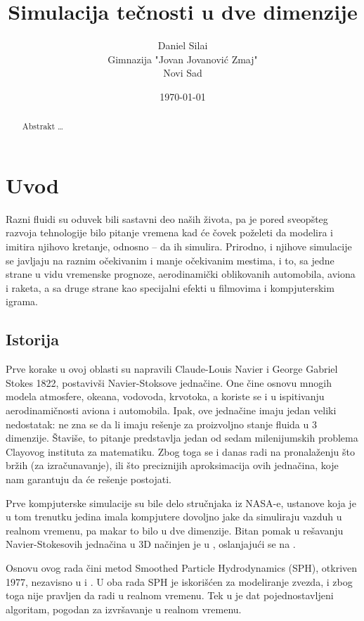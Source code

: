 \documentclass[12pt]{article}
\title{Simulacija te\v cnosti u dve dimenzije}
\author{
        Daniel Sila\dj i \\
        Gimnazija "Jovan Jovanovi\'{c} Zmaj"\\
		Novi Sad
}
\date{\today}
\begin{document}
\maketitle

\begin{abstract}
Abstrakt \ldots
\end{abstract}

\section{Uvod}\label{uvod}
    Razni fluidi su oduvek bili sastavni deo na\v sih \v zivota, pa je pored sveop\v steg razvoja tehnologije bilo pitanje vremena kad \'ce \v covek po\v zeleti da modelira i imitira njihovo kretanje, odnosno -- da ih simulira. Prirodno, i njihove simulacije se javljaju na raznim o\v cekivanim i manje o\v cekivanim mestima, i to, sa jedne strane u vidu vremenske prognoze, aerodinami\v cki oblikovanih automobila, aviona i raketa, a sa druge strane kao specijalni efekti u filmovima i kompjuterskim igrama.

    \subsection{Istorija}\label{istorija}
        Prve korake u ovoj oblasti su napravili Claude-Louis Navier i George Gabriel Stokes 1822, postaviv\v si Navier-Stoksove jedna\v cine.
        One \v cine osnovu mnogih modela atmosfere, okeana, vodovoda, krvotoka, a koriste se i u ispitivanju aerodinami\v cnosti aviona i automobila. Ipak, ove jedna\v cine imaju jedan veliki nedostatak: ne zna se da li imaju re\v senje za proizvoljno stanje fluida u 3 dimenzije. \v Stavi\v se, to pitanje predstavlja jedan od sedam milenijumskih problema Clayovog instituta za matematiku. Zbog toga se i danas radi na pronala\v zenju \v sto br\v zih (za izra\v cunavanje), ili \v sto preciznijih aproksimacija ovih jedna\v cina, koje nam garantuju da \'ce re\v senje postojati.

        Prve kompjuterske simulacije su bile delo stru\v cnjaka iz NASA-e, ustanove koja je u tom trenutku jedina imala kompjutere dovoljno jake da simuliraju vazduh u realnom vremenu, pa makar to bilo u dve dimenzije. Bitan pomak u re\v savanju Navier-Stokesovih jedna\v cina u 3D na\v cinjen je u \cite{Foster:1996:RAL:244304.244315}, oslanjaju\'ci se na \cite{harlow:2182}.

        Osnovu ovog rada \v cini metod Smoothed Particle Hydrodynamics (SPH), otkriven 1977, nezavisno u \cite{1977MNRAS.181..375G} i \cite{1977AJ.....82.1013L}. U oba rada SPH je iskori\v s\'cen za modeliranje zvezda, i zbog toga nije pravljen da radi u realnom vremenu. Tek u \cite{Muller:2003:PFS:846276.846298} je dat pojednostavljeni algoritam, pogodan za izvr\v savanje u realnom vremenu.
\end{document}
